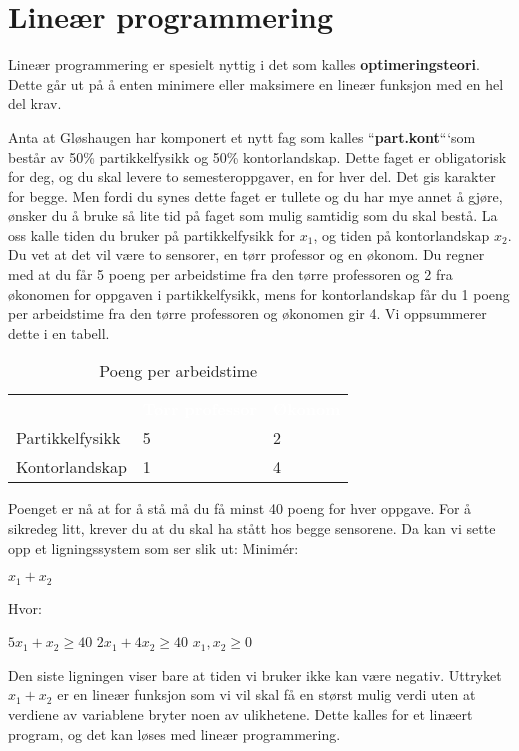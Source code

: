 \section{Lineær programmering}
Lineær programmering er spesielt nyttig i det som kalles \textbf{optimeringsteori}. Dette går ut på å enten minimere eller maksimere en lineær funksjon med en hel del krav.

\begin{boxed}
Anta at Gløshaugen har komponert et nytt fag som kalles ``\textbf{part.kont}```som består av 50\% partikkelfysikk og 50\% kontorlandskap. Dette faget er obligatorisk for deg, og du skal levere to semesteroppgaver, en for hver del. Det gis karakter for begge. Men fordi du synes dette faget er tullete og du har mye annet å gjøre, ønsker du å bruke så lite tid på faget som mulig samtidig som du skal bestå. La oss kalle tiden du bruker på partikkelfysikk for $x_1$, og tiden på kontorlandskap $x_2$. Du vet at det vil være to sensorer, en tørr professor og en økonom. Du regner med at du får 5 poeng per arbeidstime fra den tørre professoren og 2 fra økonomen for oppgaven i partikkelfysikk, mens for kontorlandskap får du 1 poeng per arbeidstime fra den tørre professoren og økonomen gir 4. Vi oppsummerer dette i en tabell.

\begin{table}[H]
    \caption{Poeng per arbeidstime}
    \label{tab:kjoretideks}
    \centering
    \begin{tabular}{|L{10em} | L{10em}|L{10em}|}
        \hline
        \textbf{\textcolor{white}{}} & \textbf{\textcolor{white}{Tørr professor}} & \textbf{\textcolor{white}{Økonom}}\\
        Partikkelfysikk & 5 & 2\\
        Kontorlandskap & 1 & 4\\
         \hline
    \end{tabular}
\end{table}

Poenget er nå at for å stå må du få minst 40 poeng for hver oppgave. For å sikredeg litt, krever du at du skal ha stått hos begge sensorene. Da kan vi sette opp et ligningssystem som ser slik ut:
\newline
\newline
Minimér:
\begin{center}
$x_1 + x_2$
\end{center}
Hvor:
\begin{center}
$5x_1 + x_2 \geq 40$ \newline
$2x_1 + 4x_2 \geq 40$ \newline
$x_1, x_2 \geq 0$
\end{center}
Den siste ligningen viser bare at tiden vi bruker ikke kan være negativ. Uttryket $x_1 + x_2$ er en lineær funksjon som vi vil skal få en størst mulig verdi uten at verdiene av variablene bryter noen av ulikhetene. Dette kalles for et linæert program, og det kan løses med lineær programmering.
\end{boxed}

